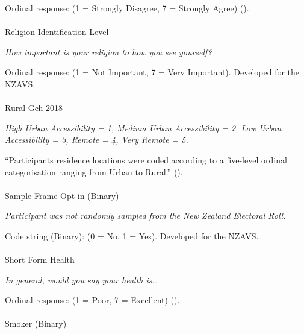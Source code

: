 \documentclass[
  single column]{article}
\makeatletter
\let\oldparagraph\paragraph
\renewcommand{\paragraph}{
    \@ifstar
      \xxxParagraphStar
      \xxxParagraphNoStar
  }
\newcommand{\xxxParagraphStar}[1]{\oldparagraph*{#1}\mbox{}}
\newcommand{\xxxParagraphNoStar}[1]{\oldparagraph{#1}\mbox{}}
\makeatother
\begin{document}
Ordinal response: (1 = Strongly Disagree, 7 = Strongly Agree)
().

\paragraph{Religion Identification
Level}\label{religion-identification-level}

\emph{How important is your religion to how you see yourself?}

Ordinal response: (1 = Not Important, 7 = Very Important). Developed for
the NZAVS.

\paragraph{Rural Gch 2018}\label{rural-gch-2018}

\emph{High Urban Accessibility = 1, Medium Urban Accessibility = 2, Low
Urban Accessibility = 3, Remote = 4, Very Remote = 5.}

``Participants residence locations were coded according to a five-level
ordinal categorisation ranging from Urban to Rural.''
().

\paragraph{Sample Frame Opt in
(Binary)}\label{sample-frame-opt-in-binary}

\emph{Participant was not randomly sampled from the New Zealand
Electoral Roll.}

Code string (Binary): (0 = No, 1 = Yes). Developed for the NZAVS.

\paragraph{Short Form Health}\label{short-form-health}

\emph{In general, would you say your health is\ldots{}}

Ordinal response: (1 = Poor, 7 = Excellent)
().

\paragraph{Smoker (Binary)}\label{smoker-binary}
\end{document}
